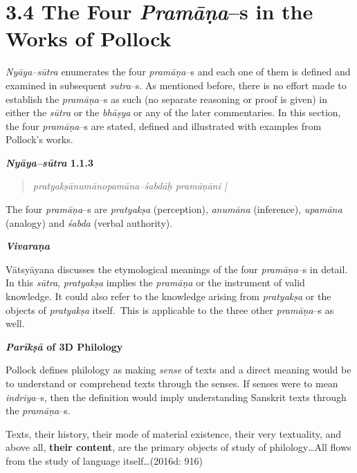 \section*{3.4 The Four \textit{Pramāṇa}–s in the Works of Pollock}

\textit{Nyāya–sūtra }enumerates the four \textit{pramāṇa}–s and each one of them is defined and examined in subsequent \textit{sutra}–s. As mentioned before, there is no effort made to establish the \textit{pramāṇa}–s as such (no separate reasoning or proof is given) in either the \textit{sūtra} or the \textit{bhāṣya} or any of the later commentaries. In this section, the four \textit{pramāṇa}–s are stated, defined and illustrated with examples from Pollock’s works.

\textbf{\textit{Nyāya–sūtra} 1.1.3}

\vspace{-.3cm}

\begin{verse}
\textit{pratyakṣānumānopamāna–śabdāḥ pramāṇāni |}
\end{verse}

\vspace{-.3cm}

The four \textit{pramāṇa}–s are \textit{pratyakṣa }(perception), \textit{anumāna} (inference), \textit{upamāna} (analogy) and \textit{śabda }(verbal authority).


\textit{\textbf{Vivaraṇa}}

Vātsyāyana discusses the etymological meanings of the four \textit{pramā\-ṇa}–s in detail. In this \textit{sūtra}, \textit{pratyakṣa} implies the \textit{pramāṇa} or the instrument of valid knowledge. It could also refer to the knowledge arising from \textit{pratyakṣa} or the objects of \textit{pratyakṣa} itself.~This is applicable to the three other \textit{pramāṇa}–s as well.

\textbf{\textit{Parīkṣā} of 3D Philology}

Pollock defines philology as making \textit{sense} of texts and a direct meaning would be to understand or comprehend texts through the senses. If senses were to mean \textit{indriya}–s, then the definition would imply understanding Sanskrit texts through the\textit{ pramāṇa}–s.

\begin{myquote}
Texts, their history, their mode of material existence, their very textuality, and above all, \textbf{their content}, are the primary objects of study of philology…All flows from the study of language itself…(2016d: 916)
\end{myquote}

